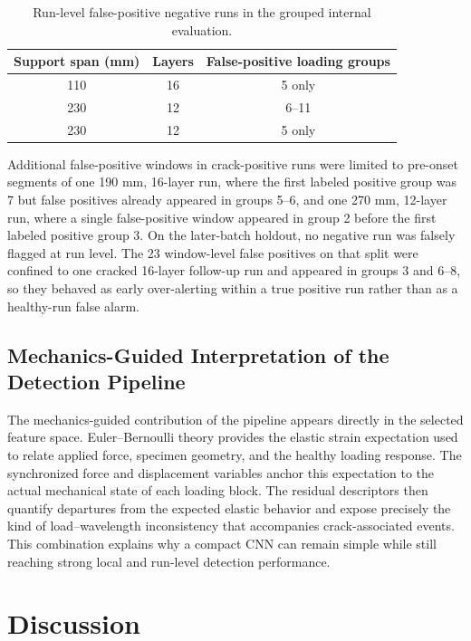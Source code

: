 \documentclass[notspecified,article,submit,pdftex,moreauthors]{Definitions/mdpi}
\newcommand{\rev}[1]{{\color{red}#1}}
\begin{document}
\begin{table}[H]
\caption{\rev{Run-level false-positive negative runs in the grouped internal evaluation.\label{tab:false_positive_runs}}}
{\color{red}
\setlength{\tabcolsep}{4pt}
\begin{tabular*}{\textwidth}{@{\extracolsep{\fill}}ccc}
\toprule
\textbf{Support span (mm)} & \textbf{Layers} & \textbf{False-positive loading groups} \\
\midrule
110 & 16 & 5 only \\
230 & 12 & 6--11 \\
230 & 12 & 5 only \\
\bottomrule
\end{tabular*}
}
\end{table}

\rev{Additional false-positive windows in crack-positive runs were limited to pre-onset segments of one 190 mm, 16-layer run, where the first labeled positive group was 7 but false positives already appeared in groups 5--6, and one 270 mm, 12-layer run, where a single false-positive window appeared in group 2 before the first labeled positive group 3. On the later-batch holdout, no negative run was falsely flagged at run level. The 23 window-level false positives on that split were confined to one cracked 16-layer follow-up run and appeared in groups 3 and 6--8, so they behaved as early over-alerting within a true positive run rather than as a healthy-run false alarm.}


\subsection{Mechanics-Guided Interpretation of the Detection Pipeline}

The mechanics-guided contribution of the pipeline appears directly in the selected feature space. Euler--Bernoulli theory provides the elastic strain expectation used to relate applied force, specimen geometry, and the healthy loading response. The synchronized force and displacement variables anchor this expectation to the actual mechanical state of each loading block. The residual descriptors then quantify departures from the expected elastic behavior and expose precisely the kind of load--wavelength inconsistency that accompanies crack-associated events. This combination explains why a compact CNN can remain simple while still reaching strong local and run-level detection performance.

\section{Discussion}
\end{document}
